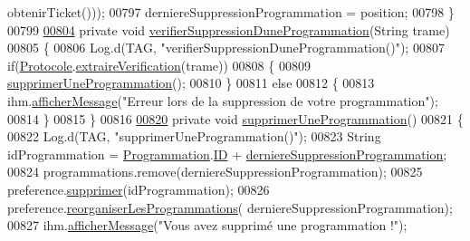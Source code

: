 \begin{DoxyCode}
      obtenirTicket()));
00797         derniereSuppressionProgrammation = position;
00798     \}
00799 
\hyperlink{classcom_1_1example_1_1ekawa_1_1_cafetiere_a316296ae1fad708259a403c60099caa1}{00804}     \textcolor{keyword}{private} \textcolor{keywordtype}{void} \hyperlink{classcom_1_1example_1_1ekawa_1_1_cafetiere_a316296ae1fad708259a403c60099caa1}{verifierSuppressionDuneProgrammation}(String trame)
00805     \{
00806         Log.d(TAG, \textcolor{stringliteral}{"verifierSuppressionDuneProgrammation()"});
00807         \textcolor{keywordflow}{if}(\hyperlink{classcom_1_1example_1_1ekawa_1_1_protocole}{Protocole}.\hyperlink{classcom_1_1example_1_1ekawa_1_1_protocole_add9d5727209d29af21fa468e6929fe0b}{extraireVerification}(trame))
00808         \{
00809             \hyperlink{classcom_1_1example_1_1ekawa_1_1_cafetiere_a40880363bf27354c1a7cb5df139fae53}{supprimerUneProgrammation}();
00810         \}
00811         \textcolor{keywordflow}{else}
00812         \{
00813             ihm.\hyperlink{classcom_1_1example_1_1ekawa_1_1_ihm_ab1ca33ad18d42540299e3a58a82f4d9a}{afficherMessage}(\textcolor{stringliteral}{"Erreur lors de la suppression de votre programmation"});
00814         \}
00815     \}
00816 
\hyperlink{classcom_1_1example_1_1ekawa_1_1_cafetiere_a40880363bf27354c1a7cb5df139fae53}{00820}     \textcolor{keyword}{private} \textcolor{keywordtype}{void} \hyperlink{classcom_1_1example_1_1ekawa_1_1_cafetiere_a40880363bf27354c1a7cb5df139fae53}{supprimerUneProgrammation}()
00821     \{
00822         Log.d(TAG, \textcolor{stringliteral}{"supprimerUneProgrammation()"});
00823         String idProgrammation = \hyperlink{classcom_1_1example_1_1ekawa_1_1_programmation}{Programmation}.\hyperlink{classcom_1_1example_1_1ekawa_1_1_programmation_ae0552520e4ca9dc152bb503a7a00bf3a}{ID} + 
      \hyperlink{classcom_1_1example_1_1ekawa_1_1_cafetiere_a79faede6506425563ec617affef48e09}{derniereSuppressionProgrammation};
00824         programmations.remove(derniereSuppressionProgrammation);
00825         preference.\hyperlink{classcom_1_1example_1_1ekawa_1_1_preference_a63914421a8e7b8f79822853e3aff3106}{supprimer}(idProgrammation);
00826         preference.\hyperlink{classcom_1_1example_1_1ekawa_1_1_preference_a98ab818534d930d51fa09de962780fe3}{reorganiserLesProgrammations}(
      derniereSuppressionProgrammation);
00827         ihm.\hyperlink{classcom_1_1example_1_1ekawa_1_1_ihm_ab1ca33ad18d42540299e3a58a82f4d9a}{afficherMessage}(\textcolor{stringliteral}{"Vous avez supprimé une programmation !"});

\end{DoxyCode}
